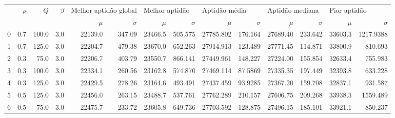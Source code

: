 \begin{tabular}{lrrrrrrrrrrrrr}
\toprule
   & $\rho$ & $Q$   & $\beta$ & \multicolumn{2}{p{2.0cm}}{Melhor aptidão global} & \multicolumn{2}{l}{Melhor aptidão} & \multicolumn{2}{l}{Aptidão média} & \multicolumn{2}{l}{Aptidão mediana} & \multicolumn{2}{l}{Pior aptidão}                                         \\
   &        &       &         & $\mu$                                            & $\sigma$                           & $\mu$                             & $\sigma$                            & $\mu$       & $\sigma$   & $\mu$    & $\sigma$   & $\mu$   & $\sigma$    \\
\midrule
0  & 0.7    & 100.0 & 3.0     & 22139.0                                          & 347.09                         & 23466.5                           & 505.575                          & 27785.802 & 176.164 & 27689.40 & 233.642 & 33603.3 & 1217.9388 \\
1  & 0.7    & 125.0 & 3.0     & 22204.7                                          & 479.38                         & 23670.0                           & 652.263                          & 27914.913 & 123.489 & 27771.45 & 114.871 & 33800.9 & 810.693 \\
2  & 0.3    & 75.0  & 3.0     & 22206.7                                          & 403.79                         & 23550.7                           & 866.141                          & 27449.961 & 148.227 & 27224.00 & 155.854 & 32633.4 & 755.983 \\
3  & 0.3    & 100.0 & 3.0     & 22334.1                                          & 260.56                         & 23162.8                           & 574.870                          & 27469.114 & 87.5869 & 27335.35 & 197.449 & 32393.8 & 633.228 \\
4  & 0.3    & 125.0 & 3.0     & 22429.5                                          & 278.26                         & 23164.6                           & 493.491                          & 27437.459 & 93.9285 & 27367.20 & 159.708 & 32837.1 & 931.587 \\
5  & 0.5    & 125.0 & 3.0     & 22456.0                                          & 263.15                         & 23488.7                           & 537.761                          & 27762.289 & 210.157 & 27606.75 & 209.268 & 33938.3 & 1559.489 \\
6  & 0.5    & 75.0  & 3.0     & 22475.7                                          & 233.72                         & 23605.8                           & 649.736                          & 27703.592 & 128.875 & 27496.15 & 185.101 & 33921.1 & 850.237 \\

\end{tabular}
